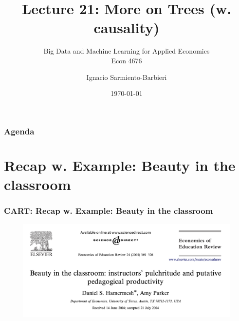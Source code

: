 \documentclass[
  shownotes,
  xcolor={svgnames},
  hyperref={colorlinks,citecolor=DarkBlue,linkcolor=DarkRed,urlcolor=DarkBlue}
  , aspectratio=169]{beamer}
\begin{document}
 
\title[Lecture 21]{Lecture 21:  More on Trees (w. causality)}
\subtitle{Big Data and Machine Learning for Applied Economics \\ Econ 4676}
\date{\today}

\author[Sarmiento-Barbieri]{Ignacio Sarmiento-Barbieri}


\begin{frame}[noframenumbering]
\maketitle
\end{frame}






\begin{frame}
\frametitle{Agenda}

\tableofcontents

\end{frame}

\section{Recap w. Example: Beauty in the classroom }
\begin{frame}[fragile]
\frametitle{CART: Recap w. Example: Beauty in the classroom}




  \begin{figure}[H] \centering
            \captionsetup{justification=centering}
              \includegraphics[scale=0.4]{figures/beauty_hamermesh}
              
 \end{figure}

\end{frame}
\end{document}
